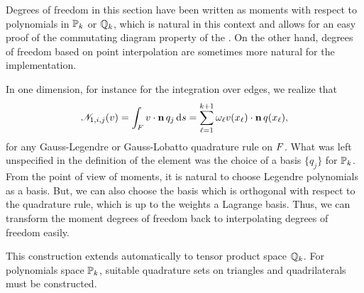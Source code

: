 \begin{remark}
  Degrees of freedom in this section have been written as moments with
  respect to polynomials in $\P_k$ or $\Q_k$, which is natural in this
  context and allows for an easy proof of the commutating diagram
  property of the . On the other hand,
  degrees of freedom based on point interpolation are sometimes more
  natural for the implementation.

  In one dimension, for instance for the integration over edges, we
  realize that
  \begin{gather}
    \nodal_{1,i,j} (v) = \int_{\face} v\cdot\n \,q_j \ds
    = \sum_{\ell=1}^{k+1} \omega_\ell v(x_\ell)\cdot\n\,q(x_\ell),
  \end{gather}
  for any Gauss-Legendre or Gauss-Lobatto quadrature rule on
  $\face$. What was left unspecified in the definition of the element
  was the choice of a basis $\{q_j\}$ for $\P_k$. From the point of
  view of moments, it is natural to choose Legendre polynomials as a
  basis. But, we can also choose the basis which is orthogonal with
  respect to the quadrature rule, which is up to the weights a
  Lagrange basis. Thus, we can transform the moment degrees of freedom
  back to interpolating degrees of freedom easily.

  This construction extends automatically to tensor product space
  $\Q_k$. For polynomials space $\P_k$, suitable quadrature sets on
  triangles and quadrilaterals must be constructed.
\end{remark}



